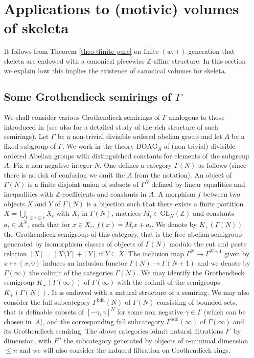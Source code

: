 \documentclass[JEP,XML,SOM,Unicode,ThmDefs,NoEqCountersInSection,published]{cedram}
\newcommand{\DOAG}{\mathrm{DOAG}}
\newcommand{\Z}{\mathbb Z}
\theoremstyle{plain}
\theoremstyle{definition}
\begin{document}
\section{Applications to (motivic) volumes of skeleta}\label{sec:volumes}

It follows from Theorem \ref{theo-tfinite-pure} on finite $(w,+)$-generation that skeleta are endowed with a canonical piecewise
$\Z$-affine structure. In
this section we explain how
this implies the existence of canonical volumes for skeleta.

\subsection{Some Grothendieck semirings of $\Gamma$}
We shall consider various Grothendieck semirings of $\Gamma$
analogous to those introduced in  \cite[\S 9]{HK} (see also \cite{HK2} for a detailed study of the rich structure of such semirings).
Let $\Gamma$ be a non-trivial
divisible ordered abelian group
and let $A$ be a fixed subgroup of $\Gamma$.
We work in
the theory $\DOAG_A$ of (non-trivial)
divisible ordered Abelian groups with distinguished constants for elements of the subgroup $A$.
Fix a non negative integer $N$. One defines a category $\Gamma (N)$ as follows (since there is no risk of confusion we omit the $A$ from the notation).
An object of $\Gamma (N)$ is a finite disjoint union of subsets of $\Gamma^N$ defined by linear equalities and inequalities with $\Z$-coefficients and constants in $A$. A morphism $f$ between
two objects
$X$ and $Y$ of $\Gamma (N)$ is a bijection such that there exists a finite partition $X = \bigcup_{1 \leq i \leq r} X_i$ with
$X_i$ in $\Gamma (N)$, matrices
$M_i \in \mathrm{GL}_N(\Z)$ and constants $a_i \in A^N$, such that for $x \in X_i$,
$f (x) = M_i x + a_i$.
We denote by $K_+ (\Gamma (N))$ the Grothendieck semigroup of this category, that is the free abelian semigroup generated by isomorphism
classes of objects of $\Gamma (N)$ modulo the cut and paste relation $[X] = [X\setminus Y ] + [Y]$ if $Y \subseteq X$.
The inclusion map $\Gamma^N \to \Gamma^{N+1}$ given by $x \mapsto (x, 0)$ induces an inclusion functor
$\Gamma (N) \to \Gamma (N+1)$ and we denote by $\Gamma (\infty)$ the colimit of the categories
$\Gamma (N)$. We may identify the Grothendieck semigroup $K_+ (\Gamma (\infty))$ of $\Gamma (\infty)$ with the colimit of the semigroups
$K_+ (\Gamma (N))$. It is endowed with a natural structure of a semiring.
We may also consider the full subcategory $\Gamma^{\mathrm{bdd}} (N)$ of
$\Gamma (N)$
consisting of bounded sets, that is definable subsets of $[-\gamma, \gamma]^N$ for some non negative $\gamma \in \Gamma$ (which can be chosen in~$A$),
and the corresponding full subcategory $\Gamma^{\mathrm{bdd}} (\infty)$ of
$\Gamma (\infty)$ and its Grothendieck semiring.
The above categories admit natural filtrations $F^{\cdot}$ by dimension, with
$F^n$
the subcategory generated by objects of o-minimal dimension $\leq n$ and we will also consider the induced filtration on Grothendieck rings.
\end{document}
